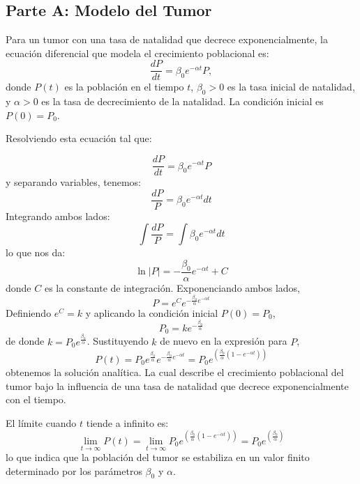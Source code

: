 \documentclass[a4paper,10pt,twocolumn]{article}
\begin{document}

\subsection{Parte A: Modelo del Tumor}\label{subsec:parte-a}


Para un tumor con una tasa de natalidad que decrece exponencialmente, la ecuación diferencial que modela el crecimiento poblacional es:
\[\frac{dP}{dt} = \beta_0 e^{-\alpha t} P,\]
donde \(P(t)\) es la población en el tiempo \(t\), \(\beta_0 > 0\) es la tasa inicial de natalidad, y \(\alpha  > 0\) es la tasa de decrecimiento de la natalidad. La condición inicial es \(P(0) = P_0\).

Resolviendo esta ecuación tal que: 

\[\frac{dP}{dt} = \beta_0 e^{-\alpha t} P\]
y separando variables, tenemos:
\[\frac{dP}{P} = \beta_0 e^{-\alpha t} dt\]
Integrando ambos lados:
\[\int \frac{dP}{P} = \int \beta_0 e^{-\alpha t} dt\]
lo que nos da:
\[\ln|P| = -\frac{\beta_0}{\alpha} e^{-\alpha t} + C\]
donde \(C\) es la constante de integración.
Exponenciando ambos lados,
\[P = e^C e^{-\frac{\beta_0}{\alpha} e^{-\alpha t}}\]
Definiendo \(e^C = k\) y aplicando la condición inicial \(P(0) = P_0\),
\[P_0 = k e^{-\frac{\beta_0}{\alpha}}\]
de donde \(k = P_0 e^{\frac{\beta_0}{\alpha}}\).
Sustituyendo \(k\) de nuevo en la expresión para \(P\),
\[P(t) = P_0 e^{\frac{\beta_0}{\alpha}} e^{-\frac{\beta_0}{\alpha} e^{-\alpha t}} = P_0 e^{\left(\frac{\beta_0}{\alpha}(1 - e^{-\alpha t})\right)}\]
obtenemos la solución analítica.
La cual describe el crecimiento poblacional del tumor bajo la influencia de una tasa de natalidad que decrece exponencialmente con el tiempo.

El límite cuando \(t\) tiende a infinito es:
\[\lim_{t \to \infty} P(t) = \lim_{t \to \infty} P_0 e^{\left(\frac{\beta_0}{\alpha}(1 - e^{-\alpha t})\right)} = P_0 e^{\left(\frac{\beta_0}{\alpha}\right)}\]
lo que indica que la población del tumor se estabiliza en un valor finito determinado por los parámetros \(\beta_0\) y \(\alpha\).
\end{document}
